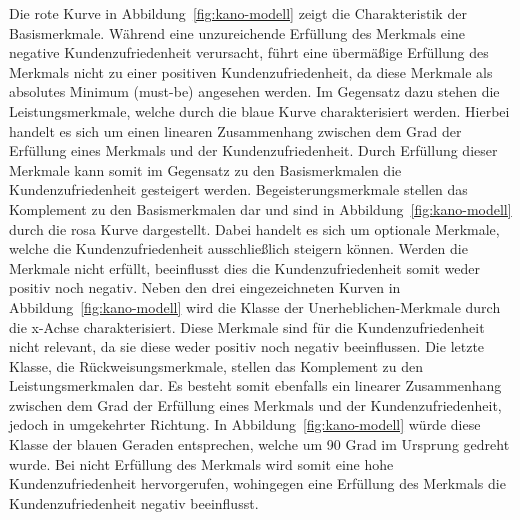 Die rote Kurve in Abbildung~\ref{fig:kano-modell} zeigt die Charakteristik der Basismerkmale.
Während eine unzureichende Erfüllung des Merkmals eine negative Kundenzufriedenheit verursacht, führt eine übermäßige Erfüllung des Merkmals nicht zu einer positiven Kundenzufriedenheit, da diese Merkmale als absolutes Minimum (must-be) angesehen werden.
\newparagraph
Im Gegensatz dazu stehen die Leistungsmerkmale, welche durch die blaue Kurve charakterisiert werden.
Hierbei handelt es sich um einen linearen Zusammenhang zwischen dem Grad der Erfüllung eines Merkmals und der Kundenzufriedenheit.
Durch Erfüllung dieser Merkmale kann somit im Gegensatz zu den Basismerkmalen die Kundenzufriedenheit gesteigert werden.
\newparagraph
Begeisterungsmerkmale stellen das Komplement zu den Basismerkmalen dar und sind in Abbildung~\ref{fig:kano-modell} durch die rosa Kurve dargestellt.
Dabei handelt es sich um optionale Merkmale, welche die Kundenzufriedenheit ausschließlich steigern können.
Werden die Merkmale nicht erfüllt, beeinflusst dies die Kundenzufriedenheit somit weder positiv noch negativ.
\newparagraph
Neben den drei eingezeichneten Kurven in Abbildung~\ref{fig:kano-modell} wird die Klasse der Unerheblichen-Merkmale durch die x-Achse charakterisiert.
Diese Merkmale sind für die Kundenzufriedenheit nicht relevant, da sie diese weder positiv noch negativ beeinflussen.
\newparagraph
Die letzte Klasse, die Rückweisungsmerkmale, stellen das Komplement zu den Leistungsmerkmalen dar.
Es besteht somit ebenfalls ein linearer Zusammenhang zwischen dem Grad der Erfüllung eines Merkmals und der Kundenzufriedenheit, jedoch in umgekehrter Richtung.
In Abbildung~\ref{fig:kano-modell} würde diese Klasse der blauen Geraden entsprechen, welche um 90 Grad im Ursprung gedreht wurde.
Bei nicht Erfüllung des Merkmals wird somit eine hohe Kundenzufriedenheit hervorgerufen, wohingegen eine Erfüllung des Merkmals die Kundenzufriedenheit negativ beeinflusst.
\newline


